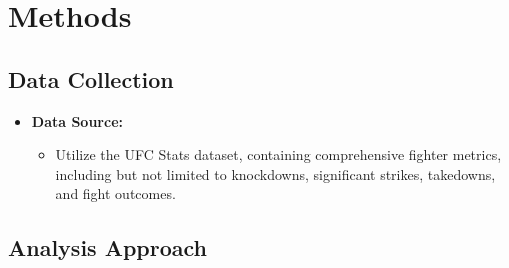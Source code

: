 \documentclass[
  man,floatsintext]{apa6}
\providecommand{\tightlist}{%
  \setlength{\itemsep}{0pt}\setlength{\parskip}{0pt}}
\begin{document}
\hypertarget{methods}{%
\section{Methods}\label{methods}}

\hypertarget{data-collection}{%
\subsection{Data Collection}\label{data-collection}}

\begin{itemize}
\tightlist
\item
  \textbf{Data Source:}

  \begin{itemize}
  \tightlist
  \item
    Utilize the UFC Stats dataset, containing comprehensive fighter metrics, including but not limited to knockdowns, significant strikes, takedowns, and fight outcomes.
  \end{itemize}
\end{itemize}

\hypertarget{analysis-approach}{%
\subsection{Analysis Approach}\label{analysis-approach}}
\end{document}
